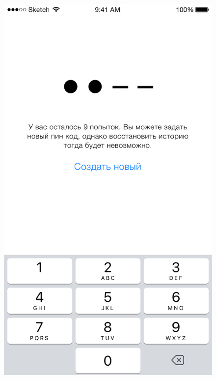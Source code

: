 \begin{figure}[h]
\begin{minipage}{.33\textwidth}
  \includegraphics[height=0.25\textheight]{inc/img/ui/pin_core_reset.png}
  \label{sec:usage:pin:reset}
\end{minipage}
\end{figure}